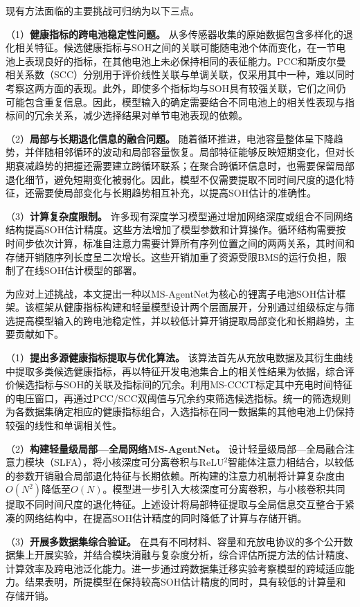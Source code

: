 现有方法面临的主要挑战可归纳为以下三点。

（1）\textbf{健康指标的跨电池稳定性问题。} 从多传感器收集的原始数据包含多样化的退化相关特征。候选健康指标与SOH之间的关联可能随电池个体而变化，在一节电池上表现良好的指标，在其他电池上未必保持相同的表征能力。PCC和斯皮尔曼相关系数（SCC）分别用于评价线性关联与单调关联，仅采用其中一种，难以同时考察这两方面的表现。此外，即使多个指标均与SOH具有较强关联，它们之间仍可能包含重复信息。因此，模型输入的确定需要结合不同电池上的相关性表现与指标间的冗余关系，减少选择结果对单节电池表现的依赖。

（2）\textbf{局部与长期退化信息的融合问题。} 随着循环推进，电池容量整体呈下降趋势，并伴随相邻循环的波动和局部容量恢复。局部特征能够反映短期变化，但对长期衰减趋势的把握还需要建立跨循环联系；在聚合跨循环信息时，也需要保留局部退化细节，避免短期变化被弱化。因此，模型不仅需要提取不同时间尺度的退化特征，还需要使局部变化与长期趋势相互补充，以提高SOH估计的准确性。

（3）\textbf{计算复杂度限制。} 许多现有深度学习模型通过增加网络深度或组合不同网络结构提高SOH估计精度。这些方法增加了模型参数和计算操作。循环结构需要按时间步依次计算，标准自注意力需要计算所有序列位置之间的两两关系，其时间和存储开销随序列长度呈二次增长。这些开销加重了资源受限BMS的运行负担，限制了在线SOH估计模型的部署。

为应对上述挑战，本文提出一种以MS-AgentNet为核心的锂离子电池SOH估计框架。该框架从健康指标构建和轻量模型设计两个层面展开，分别通过组级标定与筛选提高模型输入的跨电池稳定性，并以较低计算开销提取局部变化和长期趋势，主要贡献如下。

（1）\textbf{提出多源健康指标提取与优化算法。} 该算法首先从充放电数据及其衍生曲线中提取多类候选健康指标，再以特征开发电池集合上的相关性结果为依据，综合评价候选指标与SOH的关联及指标间的冗余。利用MS-CCCT标定其中充电时间特征的电压窗口，再通过PCC/SCC双阈值与冗余约束筛选候选指标。统一的筛选规则为各数据集确定相应的健康指标组合，入选指标在同一数据集的其他电池上仍保持较强的线性和单调相关性。

（2）\textbf{构建轻量级局部—全局网络MS-AgentNet。} 设计轻量级局部—全局融合注意力模块（SLFA），将小核深度可分离卷积与ReLU$^2$智能体注意力相结合，以较低的参数开销融合局部退化特征与长期依赖。所构建的注意力机制将计算复杂度由$O(N^2)$降低至$O(N)$。模型进一步引入大核深度可分离卷积，与小核卷积共同提取不同时间尺度的退化特征。上述设计将局部特征提取与全局信息交互整合于紧凑的网络结构中，在提高SOH估计精度的同时降低了计算与存储开销。

（3）\textbf{开展多数据集综合验证。} 在具有不同材料、容量和充放电协议的多个公开数据集上开展实验，并结合模块消融与复杂度分析，综合评估所提方法的估计精度、计算效率及跨电池泛化能力。进一步通过跨数据集迁移实验考察模型的跨域适应能力。结果表明，所提模型在保持较高SOH估计精度的同时，具有较低的计算量和存储开销。
